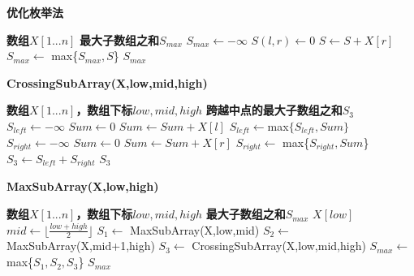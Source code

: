 \documentclass{article}
\begin{document}
\begin{CJK}{UTF8}{gbsn}
    \begin{algorithm}
        \caption{\textbf{优化枚举法}}
        \begin{algorithmic}[1]
            \Require \textbf{数组$X[1...n]$}
            \Ensure \textbf{最大子数组之和$S_{max}$}
            \State $S_{max} \leftarrow -\infty$
                \State $S(l,r) \leftarrow 0$
                    \State $S \leftarrow S+X[r]$
                    \State $S_{max} \leftarrow$ max\{$S_{max},S$\}
                \EndFor
            \EndFor
            \State \Return $S_{max}$
        \end{algorithmic}
    \end{algorithm}

    \begin{algorithm}
            \caption{\textbf{CrossingSubArray(X,low,mid,high)}}
            \begin{algorithmic}[1]
                \Require \textbf{数组$X[1...n]$，数组下标$low,mid,high$}
                \Ensure \textbf{跨越中点的最大子数组之和$S_3$}
                \State $S_{left} \leftarrow -\infty$
                \State $Sum \leftarrow 0$
                    \State $Sum \leftarrow Sum+X[l]$
                    \State $S_{left} \leftarrow $max$\{S_{left},Sum\}$
                \EndFor
                \State $S_{right} \leftarrow -\infty$
                \State $Sum \leftarrow 0$
                    \State $Sum \leftarrow Sum+X[r]$
                    \State $S_{right} \leftarrow$ max\{$S_{right},Sum$\}
                \EndFor
                \State $S_3 \leftarrow S_{left}+S_{right}$
                \State \Return $S_3$
        \end{algorithmic}
    \end{algorithm}

    \begin{algorithm}
            \caption{\textbf{MaxSubArray(X,low,high)}}
            \begin{algorithmic}[1]
                \Require \textbf{数组$X[1...n]$，数组下标$low,mid,high$}
                \Ensure \textbf{最大子数组之和$S_{max}$}
                    \State \Return $X[low]$
                \Else
                    \State $mid \leftarrow \lfloor \frac{low+high}{2} \rfloor$
                    \State $S_1 \leftarrow $ MaxSubArray(X,low,mid)
                    \State $S_2 \leftarrow $ MaxSubArray(X,mid+1,high)
                    \State $S_3 \leftarrow $ CrossingSubArray(X,low,mid,high)
                    \State $S_{max} \leftarrow $ max\{$S_1,S_2,S_3$\}
                    \State \Return $S_{max}$
                \EndIf
        \end{algorithmic}
    \end{algorithm}


    \end{CJK}
\end{document}
